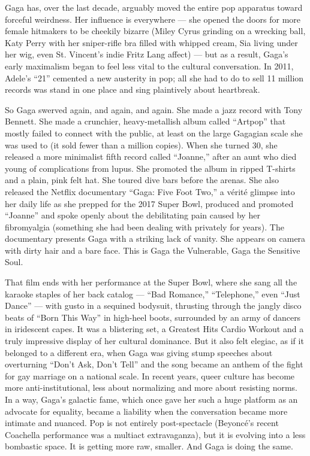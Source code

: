 Gaga has, over the last decade, arguably moved the entire pop apparatus
toward forceful weirdness. Her influence is everywhere --- she opened
the doors for more female hitmakers to be cheekily bizarre (Miley Cyrus
grinding on a wrecking ball, Katy Perry with her sniper-rifle bra filled
with whipped cream, Sia living under her wig, even St. Vincent's indie
Fritz Lang affect) --- but as a result, Gaga's early maximalism began to
feel less vital to the cultural conversation. In 2011, Adele's ``21''
cemented a new austerity in pop; all she had to do to sell 11 million
records was stand in one place and sing plaintively about heartbreak.

So Gaga swerved again, and again, and again. She made a jazz record with
Tony Bennett. She made a crunchier, heavy-metallish album called
``Artpop'' that mostly failed to connect with the public, at least on
the large Gagagian scale she was used to (it sold fewer than a million
copies). When she turned 30, she released a more minimalist fifth record
called ``Joanne,'' after an aunt who died young of complications from
lupus. She promoted the album in ripped T-shirts and a plain, pink felt
hat. She toured dive bars before the arenas. She also released the
Netflix documentary ``Gaga: Five Foot Two,'' a vérité glimpse into her
daily life as she prepped for the 2017 Super Bowl, produced and promoted
``Joanne'' and spoke openly about the debilitating pain caused by her
fibromyalgia (something she had been dealing with privately for years).
The documentary presents Gaga with a striking lack of vanity. She
appears on camera with dirty hair and a bare face. This is Gaga the
Vulnerable, Gaga the Sensitive Soul.

That film ends with her performance at the Super Bowl, where she sang
all the karaoke staples of her back catalog --- ``Bad Romance,''
``Telephone,'' even ``Just Dance'' --- with gusto in a sequined
bodysuit, thrusting through the jangly disco beats of ``Born This Way''
in high-heel boots, surrounded by an army of dancers in iridescent
capes. It was a blistering set, a Greatest Hits Cardio Workout and a
truly impressive display of her cultural dominance. But it also felt
elegiac, as if it belonged to a different era, when Gaga was giving
stump speeches about overturning ``Don't Ask, Don't Tell'' and the song
became an anthem of the fight for gay marriage on a national scale. In
recent years, queer culture has become more anti-institutional, less
about normalizing and more about resisting norms. In a way, Gaga's
galactic fame, which once gave her such a huge platform as an advocate
for equality, became a liability when the conversation became more
intimate and nuanced. Pop is not entirely post-spectacle (Beyoncé's
recent Coachella performance was a multiact extravaganza), but it is
evolving into a less bombastic space. It is getting more raw, smaller.
And Gaga is doing the same.

